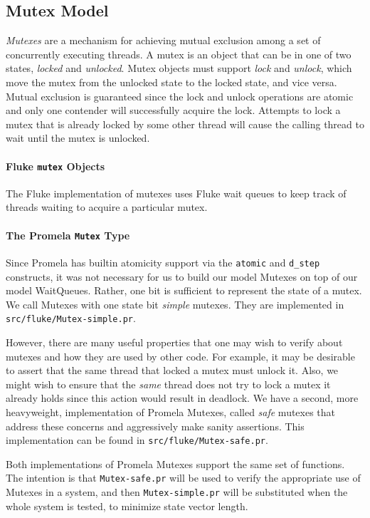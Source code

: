 \subsection{Mutex Model}
\label{mutex-model}

{\it Mutexes} are a mechanism for
achieving mutual exclusion among a set of concurrently executing threads.  
A mutex is an object that can be in one of two states, {\it locked} and 
{\it unlocked}.  Mutex objects must support {\it lock} and {\it unlock},
which move the mutex from the unlocked state to the locked state, and
vice versa. Mutual exclusion is guaranteed since the lock and unlock
operations are atomic and only one contender will successfully acquire
the lock. Attempts to lock a mutex that is already locked by some 
other thread will cause the calling thread to wait until the mutex is 
unlocked.  

\paragraph{Fluke {\tt mutex} Objects}

The Fluke implementation of mutexes uses Fluke wait queues to keep track
of threads waiting to acquire a particular mutex.

\paragraph{The Promela {\tt Mutex} Type}

Since Promela has builtin atomicity support via the {\tt atomic}
and {\tt d_step} constructs, it was not necessary for us to build our
model Mutexes on top of our model WaitQueues. 
Rather, one bit is sufficient to represent the state of a mutex.
We call Mutexes with one state bit {\it simple} mutexes. They are
implemented in {\tt src/fluke/Mutex-simple.pr}.

However, there are many useful properties that one may wish to verify
about mutexes and how they are used by other code.  For example, it may
be desirable to assert that the same thread that locked a mutex must unlock
it. Also, we might wish to
ensure that the {\it same} thread does not try to lock a mutex it already
holds since this action would result in deadlock.  
We have a second, more heavyweight,
implementation of Promela Mutexes, called {\it safe} mutexes that address
these concerns and aggressively make sanity assertions.  This implementation
can be found in {\tt src/fluke/Mutex-safe.pr}.

Both implementations of Promela Mutexes support the same set of functions.
The intention is that {\tt Mutex-safe.pr} will be used to verify the
appropriate use of Mutexes in a system, and then {\tt Mutex-simple.pr}
will be substituted when the whole system is tested, to minimize state
vector length.
